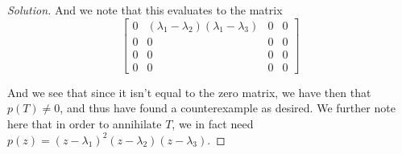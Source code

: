 \documentclass{article}
\newenvironment{solution}{\begin{proof}[Solution]}{\end{proof}}
\begin{document}
\begin{solution}
	And we note that this evaluates to the matrix
	\begin{equation*}
		\begin{bmatrix}
			0 & (\lambda_1-\lambda_2)(\lambda_1-\lambda_3) & 0 & 0 \\
			0 & 0 & 0 & 0 \\ 
			0 & 0 & 0 & 0 \\
			0 & 0 & 0 & 0
		\end{bmatrix}
	\end{equation*}

	And we see that since it isn't equal to the zero matrix, we have then that $p(T) \neq 0$, and thus have found a counterexample as desired. We further note here that in order to annihilate $T$, we in fact need $p(z) = (z- \lambda_{1})^{2}(z-\lambda_2)(z-\lambda_3)$.
%
%	
%	
%	
%	

\end{solution}
\end{document}
